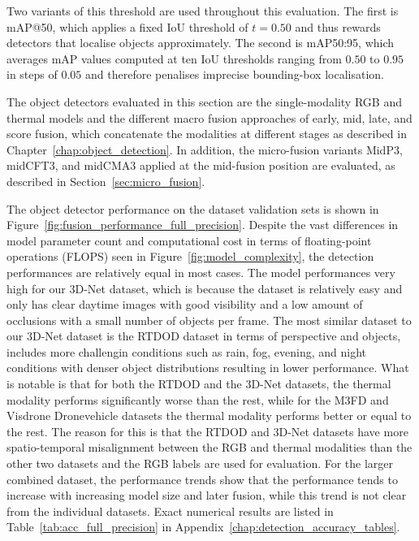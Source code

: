 \documentclass[12pt,oneside,bibtotoc,liststotoc]{scrbook}
\begin{document}
Two variants of this threshold are used throughout this evaluation. The first is
mAP@50, which applies a fixed IoU threshold of $t = 0.50$ and thus rewards detectors
that localise objects approximately. The second is mAP50:95, which averages mAP
values computed at ten IoU thresholds ranging from $0.50$ to $0.95$ in steps of $0.05$
and therefore penalises imprecise bounding-box localisation.
\cite{padilla2020surveyPerformanceMetricsObjectDetection}

The object detectors evaluated in this section are the single-modality RGB and
thermal models and the different macro fusion approaches of early, mid,
late, and score fusion, which concatenate the modalities at
different stages as described in
Chapter~\ref{chap:object_detection}. In addition, the micro-fusion variants MidP3, midCFT3, and midCMA3 applied at
the mid-fusion position are evaluated, as described in
Section~\ref{sec:micro_fusion}.

The object detector performance on the dataset validation sets is shown in
Figure~\ref{fig:fusion_performance_full_precision}. Despite the vast differences
in model parameter count and computational cost in terms of floating-point operations
(FLOPS) seen in Figure~\ref{fig:model_complexity}, the detection performances
are relatively equal in most cases.
The model performances very high for our 3D-Net dataset, which is because
the dataset is relatively easy and only has clear daytime images with good visibility
and a low amount of occlusions with a small number of objects per frame.
The most similar dataset to our 3D-Net dataset is the RTDOD dataset in terms of
perspective and objects, includes more challengin conditions such as rain, fog, evening,
and night conditions with denser object distributions resulting in lower performance.
What is notable is that for both the RTDOD and the 3D-Net datasets, the
thermal modality performs significantly worse than the rest, while for the M3FD and
Visdrone Dronevehicle datasets the thermal modality performs better or equal to the rest.
The reason for this is that the RTDOD and 3D-Net datasets have more spatio-temporal
misalignment between the RGB and thermal modalities than the other two datasets and
the RGB labels are used for evaluation.
For the larger combined dataset, the performance trends show that the performance tends to
increase with increasing model size and later fusion, while this trend is
not clear from the individual datasets.
Exact numerical results are listed in Table~\ref{tab:acc_full_precision}
in Appendix~\ref{chap:detection_accuracy_tables}.
\end{document}
